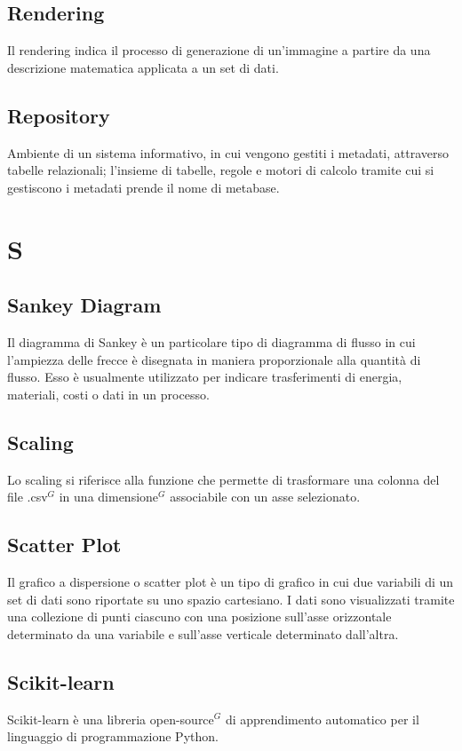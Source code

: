 \subsection{Rendering}
Il rendering indica il processo di generazione di un'immagine a partire da una descrizione matematica applicata a un set di dati.

\subsection{Repository}
Ambiente di un sistema informativo, in cui vengono gestiti i metadati, attraverso tabelle relazionali;
l’insieme di tabelle, regole e motori di calcolo tramite cui si gestiscono i metadati prende il nome di
metabase.

\newpage
\section{S}
\subsection{Sankey Diagram}
Il diagramma di Sankey è un particolare tipo di diagramma di flusso in cui l'ampiezza delle frecce è disegnata in maniera proporzionale alla quantità di flusso.
Esso è usualmente utilizzato per indicare trasferimenti di energia, materiali, costi o dati in un processo.

\subsection{Scaling}
Lo scaling si riferisce alla funzione che permette di trasformare una colonna del file .csv$^{G}$ in una dimensione$^{G}$ associabile con un asse selezionato.

\subsection{Scatter Plot}
Il grafico a dispersione o scatter plot è un tipo di grafico in cui due variabili di un set di dati sono riportate su uno spazio cartesiano.
I dati sono visualizzati tramite una collezione di punti ciascuno con una posizione sull'asse orizzontale determinato da una variabile e sull'asse verticale determinato dall'altra. 

\subsection{Scikit-learn}
Scikit-learn è una libreria open-source$^{G}$ di apprendimento automatico per il linguaggio di programmazione Python.

